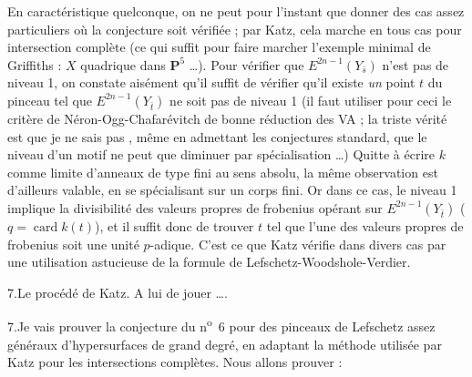 \documentclass[11pt,a4paper]{article}
\begin{document}
En caractéristique quelconque, on ne peut pour l'instant que donner des cas assez
particuliers où la conjecture soit vérifiée ; par Katz, cela marche en tous cas pour
  intersection complète  (ce qui suffit pour faire marcher l'exemple minimal de
Griffiths : $X$ quadrique dans $\mathbf{P}^5$ \ldots). Pour
vérifier que $E^{2n-1}(Y_{\bar s})$ n'est pas de niveau 1, on constate aisément
qu'il suffit de vérifier qu'il existe \emph{un} point $t$ du pinceau tel que
$E^{2n-1}(Y_{\bar t})$ ne soit pas de niveau 1 (il faut utiliser pour ceci le
critère de Néron-Ogg-Chafarévitch de bonne réduction des VA ; la triste vérité est
que je ne sais pas , même en admettant les
conjectures standard, que le niveau d'un motif ne peut que diminuer par
spécialisation \ldots) Quitte à écrire $k$ comme limite d'anneaux de type fini au
sens absolu, la même observation est d'ailleurs valable, en se spécialisant sur un
corps fini. Or dans ce cas, le niveau 1 implique  la divisibilité  des valeurs propres de frobenius opérant
sur $E^{2n-1}(Y_{\bar t})$  ($q = \operatorname{card}
k(t)$), et il suffit donc de trouver $t$ tel que l'une des valeurs propres de
frobenius soit une unité $p$-adique. C'est ce que Katz vérifie dans divers cas par
une utilisation astucieuse de la formule de Lefschetz-Woodshole-Verdier.

7.\quad Le procédé de Katz. A lui de jouer \ldots.




7.\quad Je vais prouver la conjecture du n\textsuperscript{o}~6 pour des pinceaux
de Lefschetz assez généraux d'hypersurfaces de grand degré, en adaptant la méthode
utilisée par Katz pour les intersections complètes. Nous allons
prouver :
\end{document}
